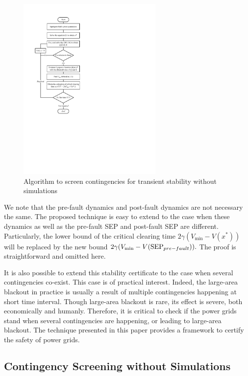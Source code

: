 \documentclass[final]{IEEEtran}
\begin{document}
\begin{figure}[t!]
\centering
\includegraphics[width = 2.8in]{Flowchart}
\caption{Algorithm to screen contingencies for transient stability without simulations}\label{flowchart}
\end{figure}


We note that the pre-fault dynamics and post-fault dynamics are
not necessary the same. The proposed technique is easy to extend
to the case when these dynamics as well as the pre-fault SEP and
post-fault SEP are different. Particularly, the lower bound of the
critical clearing time $2\gamma (V_{\min}-V(x^*))$ will be replaced by the
new bound $2\gamma (V_{\min}-V(\emph{\emph{SEP}}_{pre-fault})).$ The proof is
straightforward and omitted here.

It is also possible to extend this stability certificate to the
case when several contingencies co-exist. This case is of
practical interest. Indeed, the large-area blackout in practice is
usually  a result of multiple contingencies happening at short time interval.
Though large-area blackout is rare, its effect is severe,
both economically and humanly. Therefore, it is critical  to check
if the power grids stand when several contingencies are happening,
or leading to large-area blackout. The technique presented in this
paper provides a framework to certify the safety of power grids.







\subsection{Contingency Screening without Simulations}
\end{document}
